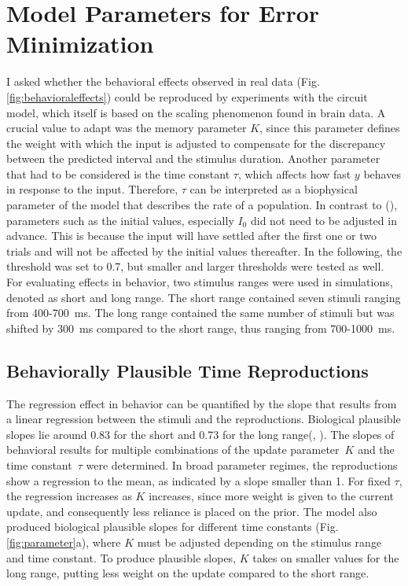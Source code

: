 \documentclass[10pt]{article}
\begin{document}
\section{Model Parameters for Error Minimization}
I asked whether the behavioral effects observed in real data (Fig. \ref{fig:behavioraleffects}) could be reproduced by experiments with the circuit model, which itself is based on the scaling phenomenon found in brain data. 
A crucial value to adapt was the memory parameter $K$, since this parameter defines the weight with which the input is adjusted to compensate for the discrepancy between the predicted interval and the stimulus duration.
Another parameter that had to be considered is the time constant $\tau$, which affects how fast $y$ behaves in response to the input. Therefore, $\tau$ can be interpreted as a biophysical parameter of the model that describes the rate of a population.
In contrast to \citeauthor{Egger2020} (\citeyear{Egger2020}), parameters such as the initial values, especially $I_0$ did not need to be adjusted in advance. This is because the input will have settled after the first one or two trials and will not be affected by the initial values thereafter.
In the following, the threshold was set to 0.7, but smaller and larger thresholds were tested as well.
For evaluating effects in behavior, two stimulus ranges were used in simulations, denoted as short and long range. 
The short range contained seven stimuli ranging from 400-700~ms. 
The long range contained the same number of stimuli but was shifted by 300~ms compared to the short range, thus ranging from 700-1000~ms.
 
\subsection{Behaviorally Plausible Time Reproductions}
The regression effect in behavior can be quantified by the slope that results from a linear regression between the stimuli and the reproductions.
Biological plausible slopes lie around 0.83 for the short and 0.73 for the long range(\cite{Sohn2019}, \cite{Henke2021}). 
The slopes of behavioral results for multiple combinations of the update parameter~$K$ and the time constant~$\tau$ were determined. 
In broad parameter regimes, the reproductions show a regression to the mean, as indicated by a slope smaller than 1. 
For fixed $\tau$, the regression increases as $K$ increases, since more weight is given to the current update, and consequently less reliance is placed on the prior. 
The model also produced biological plausible slopes for different time constants (Fig. \ref{fig:parameter}a), where $K$ must be adjusted depending on the stimulus range and time constant. 
To produce plausible slopes, $K$ takes on smaller values for the long range, putting less weight on the update compared to the short range.
\end{document}
